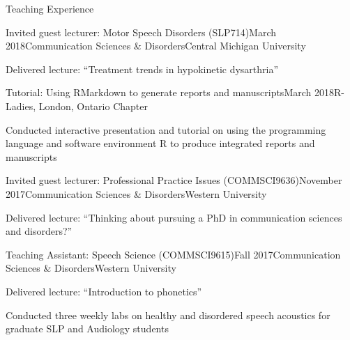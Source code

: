 \documentclass{resume} %
\begin{document}



\begin{rSection}{Teaching Experience}
	
	\begin{rSubsection}{Invited guest lecturer: Motor Speech Disorders (SLP714)}{March 2018}{Communication Sciences \& Disorders}{Central Michigan University}
	\item Delivered lecture: ``Treatment trends in hypokinetic dysarthria''
	\end{rSubsection}
	
	\begin{rSubsection}{Tutorial: Using RMarkdown to generate reports and manuscripts}{March 2018}{R-Ladies, London, Ontario Chapter}
	\item Conducted interactive presentation and tutorial on using the programming language and software environment R to produce integrated reports and manuscripts
	\end{rSubsection}
	
	\begin{rSubsection}{Invited guest lecturer: Professional Practice Issues (COMMSCI9636)}{November 2017}{Communication Sciences \& Disorders}{Western University}
	\item Delivered lecture: ``Thinking about pursuing a PhD in communication sciences and disorders?''
	\end{rSubsection}
	
	\begin{rSubsection}{Teaching Assistant: Speech Science (COMMSCI9615)}{Fall 2017}{Communication Sciences \& Disorders}{Western University}
	\item Delivered lecture: ``Introduction to phonetics''
	\item Conducted three weekly labs on healthy and disordered speech acoustics for graduate SLP and Audiology students
	\end{rSubsection}
	

\end{rSection}
\end{document}
